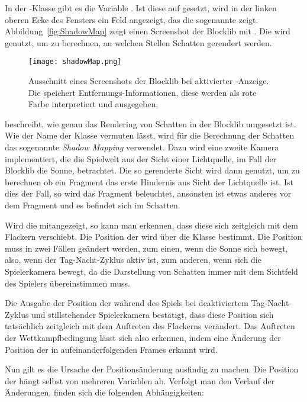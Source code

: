 In der -Klasse gibt es die Variable . Ist diese auf  gesetzt, wird in der linken oberen Ecke des Fensters ein Feld angezeigt, das die sogenannte  zeigt. Abbildung~\vref{fig:ShadowMap} zeigt einen Screenshot der Blocklib mit . Die  wird genutzt, um zu berechnen, an welchen Stellen Schatten gerendert werden.
\begin{figure}
	\centering
	\texttt{[image: shadowMap.png]}
	\caption{Ausschnitt eines Screenshots der Blocklib bei aktivierter -Anzeige. Die  speichert Entfernungs-Informationen, diese werden als rote Farbe interpretiert und ausgegeben.}\label{fig:ShadowMap}
\end{figure}
\textcite{Ebbinger2018} beschreibt, wie genau das Rendering von Schatten in der Blocklib umgesetzt ist. Wie der Name der Klasse  vermuten lässt, wird für die Berechnung der Schatten das sogenannte \emph{Shadow Mapping} verwendet. Dazu wird eine zweite Kamera implementiert, die die Spielwelt aus der Sicht einer Lichtquelle, im Fall der Blocklib die Sonne, betrachtet. Die so gerenderte Sicht wird dann genutzt, um zu berechnen ob ein Fragment das erste Hindernis aus Sicht der Lichtquelle ist. Ist dies der Fall, so wird das Fragment beleuchtet, ansonsten ist etwas anderes vor dem Fragment und es befindet sich im Schatten.

Wird die  mitangezeigt, so kann man erkennen, dass diese sich zeitgleich mit dem Flackern verschiebt. Die Position der  wird über die Klasse  bestimmt. Die Position muss in zwei Fällen geändert werden, zum einen, wenn die Sonne sich bewegt, also, wenn der Tag-Nacht-Zyklus aktiv ist, zum anderen, wenn sich die Spielerkamera bewegt, da die Darstellung von Schatten immer mit dem Sichtfeld des Spielers übereinstimmen muss.

Die Ausgabe der Position der  während des Spiels bei deaktiviertem Tag-Nacht-Zyklus und stillstehender Spielerkamera bestätigt, dass diese Position sich tatsächlich zeitgleich mit dem Auftreten des Flackerns verändert. Das Auftreten der Wettkampfbedingung lässt sich also erkennen, indem eine Änderung der Position der  in aufeinanderfolgenden Frames erkannt wird.

Nun gilt es die Ursache der Positionsänderung ausfindig zu machen. Die Position der  hängt selbst von mehreren Variablen ab. Verfolgt man den Verlauf der Änderungen, finden sich die folgenden Abhängigkeiten:

